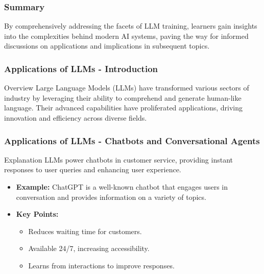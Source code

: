 \documentclass[aspectratio=169]{beamer}
\begin{document}
\begin{frame}[fragile]
    \frametitle{Summary}
    By comprehensively addressing the facets of LLM training, learners gain insights into the complexities behind modern AI systems, paving the way for informed discussions on applications and implications in subsequent topics.
\end{frame}

\begin{frame}[fragile]
    \frametitle{Applications of LLMs - Introduction}
    \begin{block}{Overview}
        Large Language Models (LLMs) have transformed various sectors of industry by leveraging their ability to comprehend and generate human-like language. Their advanced capabilities have proliferated applications, driving innovation and efficiency across diverse fields.
    \end{block}
\end{frame}

\begin{frame}[fragile]
    \frametitle{Applications of LLMs - Chatbots and Conversational Agents}
    \begin{block}{Explanation}
        LLMs power chatbots in customer service, providing instant responses to user queries and enhancing user experience.
    \end{block}
    \begin{itemize}
        \item \textbf{Example:} ChatGPT is a well-known chatbot that engages users in conversation and provides information on a variety of topics.
        \item \textbf{Key Points:}
        \begin{itemize}
            \item Reduces waiting time for customers.
            \item Available 24/7, increasing accessibility.
            \item Learns from interactions to improve responses.
        \end{itemize}
    \end{itemize}
\end{frame}
\end{document}
